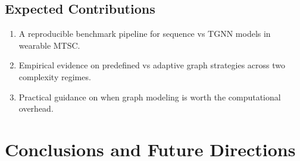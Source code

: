 \documentclass[11pt,a4paper]{article}
\begin{document}



\subsection{Expected Contributions}
\begin{enumerate}[leftmargin=*]
  \item A reproducible benchmark pipeline for sequence vs TGNN models in wearable MTSC.
  \item Empirical evidence on predefined vs adaptive graph strategies across two complexity regimes.
  \item Practical guidance on when graph modeling is worth the computational overhead.
\end{enumerate}


\newpage
\section{Conclusions and Future Directions}
\end{document}
